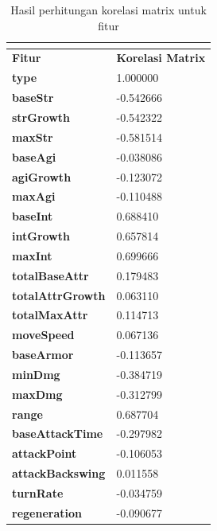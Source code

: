 \begin{longtable}{|l|l|}
	\caption{Hasil perhitungan korelasi matrix untuk fitur}
	\vspace{1ex}
	\label{tb:dota2_matrix_corel}\\
	\hline
	\rowcolor[HTML]{C0C0C0} 
	\textbf{Fitur} & \textbf{Korelasi Matrix} \\ \hline
	\textbf{type} & 1.000000 \\ \hline
	\textbf{baseStr} & -0.542666 \\ \hline
	\textbf{strGrowth} & -0.542322 \\ \hline
	\textbf{maxStr} & -0.581514 \\ \hline
	\textbf{baseAgi} & -0.038086 \\ \hline
	\textbf{agiGrowth} & -0.123072 \\ \hline
	\textbf{maxAgi} & -0.110488 \\ \hline
	\textbf{baseInt} & 0.688410 \\ \hline
	\textbf{intGrowth} & 0.657814 \\ \hline
	\textbf{maxInt} & 0.699666 \\ \hline
	\textbf{totalBaseAttr} & 0.179483 \\ \hline
	\textbf{totalAttrGrowth} & 0.063110 \\ \hline
	\textbf{totalMaxAttr} & 0.114713 \\ \hline
	\textbf{moveSpeed} & 0.067136 \\ \hline
	\textbf{baseArmor} & -0.113657 \\ \hline
	\textbf{minDmg} & -0.384719 \\ \hline
	\textbf{maxDmg} & -0.312799 \\ \hline
	\textbf{range} & 0.687704 \\ \hline
	\textbf{baseAttackTime} & -0.297982 \\ \hline
	\textbf{attackPoint} & -0.106053 \\ \hline
	\textbf{attackBackswing} & 0.011558 \\ \hline
	\textbf{turnRate} & -0.034759 \\ \hline
	\textbf{regeneration} & -0.090677 \\ \hline
\end{longtable}

